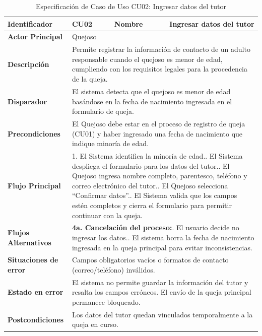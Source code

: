 \begingroup
\setlength{\parskip}{0pt}
\begin{longtable}{|p{3.5cm}|p{2cm}|p{2.5cm}|p{7cm}|}
\caption{Especificación de Caso de Uso CU02: Ingresar datos del tutor}
\label{tab:cu02_datos_tutor} \\
\hline
\textbf{Identificador} & CU02 & \textbf{Nombre} & Ingresar datos del tutor \\ \hline
\textbf{Actor Principal} & \multicolumn{3}{p{11.5cm}|}{Quejoso} \\ \hline
\textbf{Descripción} & \multicolumn{3}{p{11.5cm}|}{Permite registrar la información de contacto de un adulto responsable cuando el quejoso es menor de edad, cumpliendo con los requisitos legales para la procedencia de la queja.} \\ \hline
\textbf{Disparador} & \multicolumn{3}{p{11.5cm}|}{El sistema detecta que el quejoso es menor de edad basándose en la fecha de nacimiento ingresada en el formulario de queja.} \\ \hline
\textbf{Precondiciones} & \multicolumn{3}{p{11.5cm}|}{El Quejoso debe estar en el proceso de registro de queja (CU01) y haber ingresado una fecha de nacimiento que indique minoría de edad.} \\ \hline
\textbf{Flujo Principal} & \multicolumn{3}{p{11.5cm}|}{1. El Sistema identifica la minoría de edad.\newline 2. El Sistema despliega el formulario para los datos del tutor.\newline 3. El Quejoso ingresa nombre completo, parentesco, teléfono y correo electrónico del tutor.\newline 4. El Quejoso selecciona ``Confirmar datos''.\newline 5. El Sistema valida que los campos estén completos y cierra el formulario para permitir continuar con la queja.} \\ \hline
\textbf{Flujos Alternativos} & \multicolumn{3}{p{11.5cm}|}{\textbf{4a. Cancelación del proceso:}\newline 1. El usuario decide no ingresar los datos.\newline 2. El sistema borra la fecha de nacimiento ingresada en la queja principal para evitar inconsistencias.} \\ \hline
\textbf{Situaciones de error} & \multicolumn{3}{p{11.5cm}|}{Campos obligatorios vacíos o formatos de contacto (correo/teléfono) inválidos.} \\ \hline
\textbf{Estado en error} & \multicolumn{3}{p{11.5cm}|}{El sistema no permite guardar la información del tutor y resalta los campos erróneos. El envío de la queja principal permanece bloqueado.} \\ \hline
\textbf{Postcondiciones} & \multicolumn{3}{p{11.5cm}|}{Los datos del tutor quedan vinculados temporalmente a la queja en curso.} \\ \hline
\end{longtable}
\endgroup

